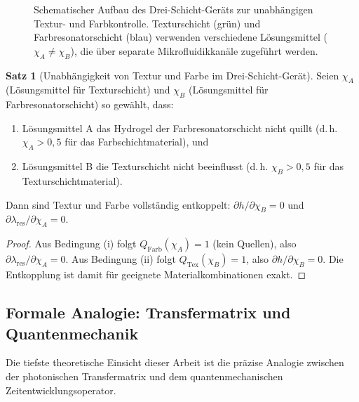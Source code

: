 ﻿\documentclass[a4paper,12pt]{article}
\theoremstyle{definition}
\newtheorem{satz}{Satz}[section]
\begin{document}
\begin{figure}[htb]
		\caption{Schematischer Aufbau des Drei-Schicht-Geräts zur unabhängigen
			Textur- und Farbkontrolle. Texturschicht (grün) und Farbresonatorschicht
			(blau) verwenden verschiedene Lösungsmittel ($\chi_A \neq \chi_B$),
			die über separate Mikrofluidikkanäle zugeführt werden.}
		\label{fig:drei-schicht}
	\end{figure}
	
	\begin{satz}[Unabhängigkeit von Textur und Farbe im Drei-Schicht-Gerät]
		\label{satz:unabhaengigkeit}
		Seien $\chi_A$ (Lösungsmittel für Texturschicht) und $\chi_B$
		(Lösungsmittel für Farbresonatorschicht) so gewählt, dass:
		\begin{enumerate}[label=(\roman*)]
			\item Lösungsmittel A das Hydrogel der Farbresonatorschicht nicht quillt
			(d.\,h. $\chi_A > 0{,}5$ für das Farbschichtmaterial), und
			\item Lösungsmittel B die Texturschicht nicht beeinflusst
			(d.\,h. $\chi_B > 0{,}5$ für das Texturschichtmaterial).
		\end{enumerate}
		Dann sind Textur und Farbe vollständig entkoppelt:
		$\partial h/\partial\chi_B = 0$ und $\partial\lambda_\mathrm{res}/\partial\chi_A = 0$.
	\end{satz}
	
	\begin{proof}
		Aus Bedingung (i) folgt $Q_\mathrm{Farb}(\chi_A) = 1$ (kein Quellen),
		also $\partial\lambda_\mathrm{res}/\partial\chi_A = 0$.
		Aus Bedingung (ii) folgt $Q_\mathrm{Tex}(\chi_B) = 1$,
		also $\partial h/\partial\chi_B = 0$.
		Die Entkopplung ist damit für geeignete Materialkombinationen exakt.
	\end{proof}
	
	\subsection{Formale Analogie: Transfermatrix und Quantenmechanik}
	\label{ssec:qm-analogie}
	
	Die tiefste theoretische Einsicht dieser Arbeit ist die präzise Analogie
	zwischen der photonischen Transfermatrix und dem quantenmechanischen
	Zeitentwicklungsoperator.
	
\end{document}
